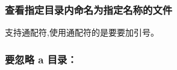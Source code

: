 \documentclass[letterpaper,10pt,english]{sphinxmanual}
\begin{document}
\subsubsection{查看指定目录内命名为指定名称的文件}
\label{\detokenize{scripts/shell/find:id3}}
%
\begin{sphinxVerbatim}[commandchars=\\\{\}]
   
\end{sphinxVerbatim}

支持通配符,使用通配符的是要要加引号。

%
\begin{sphinxVerbatim}[commandchars=\\\{\}]
   
\end{sphinxVerbatim}


\subsubsection{要忽略 a 目录：}
\label{\detokenize{scripts/shell/find:a}}
%
\begin{sphinxVerbatim}[commandchars=\\\{\}]
          
\end{sphinxVerbatim}
\end{document}
